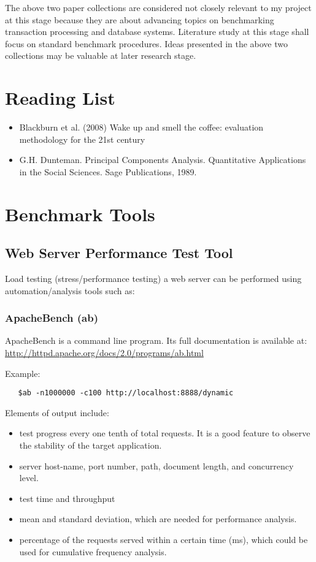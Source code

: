 \documentclass[12pt, a4paper, twoside]{article}
\begin{document}
The above two paper collections are considered not closely relevant to my project at this stage because they are about advancing topics on benchmarking transaction processing and database systems.  Literature study at this stage shall focus on standard benchmark procedures.  Ideas presented in the above two collections may be valuable at later research stage.

\section{Reading List}
\begin{itemize}
\item Blackburn et al. (2008) Wake up and smell the coffee: evaluation methodology for the 21st century \cite{Blackburn:2008}

\item G.H. Dunteman. Principal Components Analysis. Quantitative
Applications in the Social Sciences. Sage Publications, 1989.
 \cite{dunteman1989principal}
\end{itemize}


\section{Benchmark Tools}
\subsection{Web Server Performance Test Tool}
Load testing (stress/performance testing) a web server can be performed using automation/analysis tools such as:


\subsubsection{ApacheBench (ab)}
ApacheBench is a command line program.  Its full documentation is available at: \url{http://httpd.apache.org/docs/2.0/programs/ab.html}

Example:
\begin{verbatim}
   $ab -n1000000 -c100 http://localhost:8888/dynamic
\end{verbatim}

Elements of output include:
\begin{itemize}
  \item test progress every one tenth of total requests.  It is a good feature to observe the stability of the target application.
  \item server host-name, port number, path, document length, and concurrency level.
  \item test time and throughput
  \item mean and standard deviation, which are needed for performance analysis.
  \item percentage of the requests served within a certain time (ms), which could be used for cumulative frequency analysis.
\end{itemize}
\end{document}
